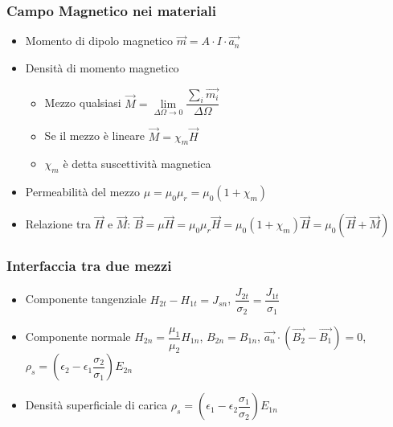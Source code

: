 \documentclass{article}
\begin{document}
\subsubsection{Campo Magnetico nei materiali}
\begin{itemize}
	\item Momento di dipolo magnetico \( \vec{m} = A \cdot I \cdot \vec{a_n} \)
	\item Densità di momento magnetico
	      \begin{itemize}
		      \item Mezzo qualsiasi \(\vec{M} = \lim\limits_{\Delta\Omega \rightarrow 0} \dfrac{\sum_i \vec{m_i}}{\Delta\Omega}\)
		      \item Se il mezzo è lineare \( \vec{M} = \chi_m \vec{H} \)
		      \item \(\chi_m\) è detta suscettività magnetica
	      \end{itemize}
	\item Permeabilità del mezzo \( \mu = \mu_0 \mu_r = \mu_0 (1 + \chi_m) \)
	\item Relazione tra \( \vec{H} \) e \( \vec{M} \): \( \vec{B} = \mu \vec{H} = \mu_0 \mu_r \vec{H} = \mu_0 (1 + \chi_m) \vec{H} = \mu_0 (\vec{H} + \vec{M}) \)
\end{itemize}



\subsubsection{Interfaccia tra due mezzi}
\begin{itemize}
	\item Componente tangenziale \( H_{2t} - H_{1t} = J_{sn} \), \( \dfrac{J_{2t}}{\sigma_2} = \dfrac{J_{1t}}{\sigma_1} \)
	\item Componente normale \( H_{2n} = \dfrac{\mu_1}{\mu_2} H_{1n} \), \(B_{2n} = B_{1n}\), \( \vec{a_n} \cdot \left(\vec{B_2} - \vec{B_1} \right) = 0 \), \( \rho_s = \left( \epsilon_2 - \epsilon_1 \dfrac{\sigma_2}{\sigma_1} \right) E_{2n} \)
	\item Densità superficiale di carica \( \rho_s = \left( \epsilon_1 - \epsilon_2 \dfrac{\sigma_1}{\sigma_2} \right) E_{1n} \)
\end{itemize}
\end{document}
